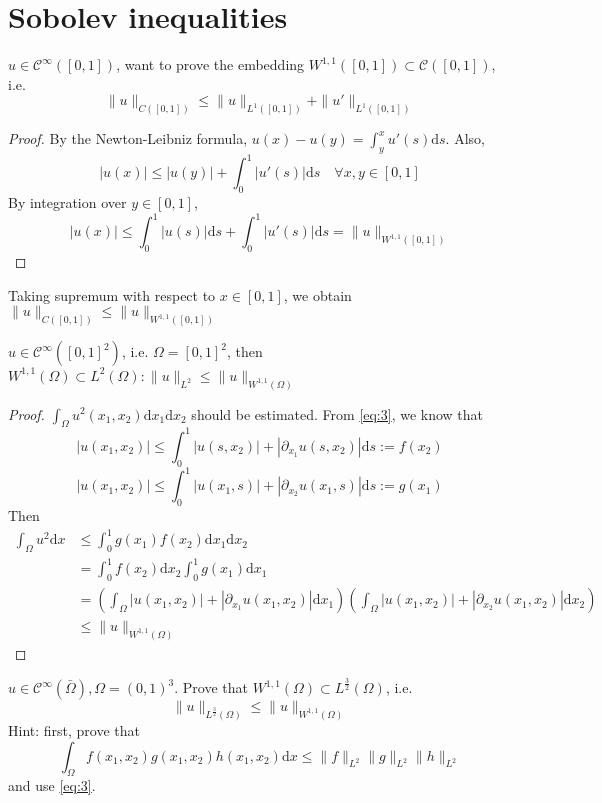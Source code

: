 \documentclass{report}
\begin{document}
\section{Sobolev inequalities}
{
    $u \in \mathcal{C}^{\infty}([0,1])$, want to prove the embedding $W^{1, 1}([0,1]) \subset \mathcal{C}([0,1])$, i.e.
    \begin{equation}\label{eq:3}
        \|u\|_{C([0,1])} \leq \|u\|_{L^{1}([0,1])} + \|u'\|_{L^{1}([0,1])}
    \end{equation}
}

\begin{proof}
    By the Newton-Leibniz formula, $u(x) - u(y) = \int_{y}^{x} u'(s) \mathrm{d}s$. Also,
    $$|u(x)| \leq |u(y)| + \int_{0}^{1} |u'(s)| \mathrm{d}s \quad \forall x, y \in [0,1]$$
    By integration over $y \in [0,1]$, 
    $$|u(x)| \leq \int_{0}^{1} |u(s)| \mathrm{d}s + \int_{0}^{1} |u'(s)| \mathrm{d}s = \|u\|_{W^{1, 1}([0, 1])}$$
\end{proof}

Taking supremum with respect to $x \in [0,1]$, we obtain $\|u\|_{C([0,1])} \leq \|u\|_{W^{1, 1}([0, 1])}$

{
    $u \in \mathcal{C}^{\infty}([0,1]^2)$,  i.e. $\Omega = [0,1]^2$, then $W^{1, 1}(\Omega) \subset L^{2}(\Omega) : \|u\|_{L^{2}} \leq \|u\|_{W^{1, 1}(\Omega)}$
}

\begin{proof}
    $\int_{\Omega} u^{2}(x_1, x_2) \mathrm{d}x_1 \mathrm{d}x_2$ should be estimated. From \ref{eq:3}, we know that 
    $$|u(x_1, x_2)| \leq \int_{0}^{1} |u(s, x_2)| + |\partial_{x_1} u(s, x_2)| \mathrm{d}s := f(x_2)$$
    $$|u(x_1, x_2)| \leq \int_{0}^{1} |u(x_1, s)| + |\partial_{x_2} u(x_1, s)| \mathrm{d}s := g(x_1)$$  
    Then 
    \begin{align*}
        \int_{\Omega} u^2 \mathrm{d}x &\leq \int_{0}^{1} g(x_1)f(x_2) \mathrm{d}x_1 \mathrm{d}x_2 \\
        &= \int_{0}^{1} f(x_2) \mathrm{d}x_2 \int_{0}^{1} g(x_1) \mathrm{d}x_1 \\
        &= \left(\int_{\Omega} |u(x_1, x_2)| + |\partial_{x_1} u(x_1, x_2)| \mathrm{d}x_1 \right) \left(\int_{\Omega} |u(x_1, x_2)| + |\partial_{x_2} u(x_1, x_2)| \mathrm{d}x_2 \right) \\
        &\leq \|u\|_{W^{1, 1}(\Omega)}
    \end{align*}
\end{proof}

{
    $u \in \mathcal{C}^{\infty}(\bar{\Omega}), \Omega = (0,1)^3$. Prove that $W^{1, 1}(\Omega) \subset L^{\frac{3}{2}}(\Omega)$, i.e.
    \begin{equation}\label{eq:4}
        \|u\|_{L^{\frac{3}{2}}(\Omega)} \leq \|u\|_{W^{1, 1}(\Omega)}
    \end{equation}
    Hint: first, prove that
    $$\int_{\Omega} f(x_1, x_2)g(x_1, x_2)h(x_1, x_2) \mathrm{d}x \leq \|f\|_{L^{2}} \|g\|_{L^{2}} \|h\|_{L^{2}}$$
    and use \ref{eq:3}.
}
\end{document}
